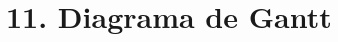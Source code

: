 \documentclass[
11pt, %
codirector, %
]{charter}
\begin{document}
\section{11. Diagrama de Gantt}
\label{sec:gantt}

%
%
%
%
%
%
\end{document}
